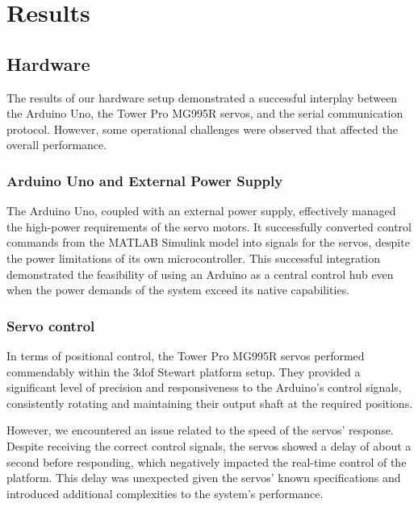 \section{Results}
\subsection{Hardware}
The results of our hardware setup demonstrated a successful interplay between the Arduino Uno, the Tower Pro MG995R servos, and the serial communication protocol. However, some operational challenges were observed that affected the overall performance.\newline

\subsubsection {Arduino Uno and External Power Supply}

The Arduino Uno, coupled with an external power supply, effectively managed the high-power requirements of the servo motors. It successfully converted control commands from the MATLAB Simulink model into signals for the servos, despite the power limitations of its own microcontroller. This successful integration demonstrated the feasibility of using an Arduino as a central control hub even when the power demands of the system exceed its native capabilities.\newline

\subsubsection{Servo control}

In terms of positional control, the Tower Pro MG995R servos performed commendably within the 3dof Stewart platform setup. They provided a significant level of precision and responsiveness to the Arduino's control signals, consistently rotating and maintaining their output shaft at the required positions.\newline

However, we encountered an issue related to the speed of the servos' response. Despite receiving the correct control signals, the servos showed a delay of about a second before responding, which negatively impacted the real-time control of the platform. This delay was unexpected given the servos' known specifications and introduced additional complexities to the system's performance.\newline

